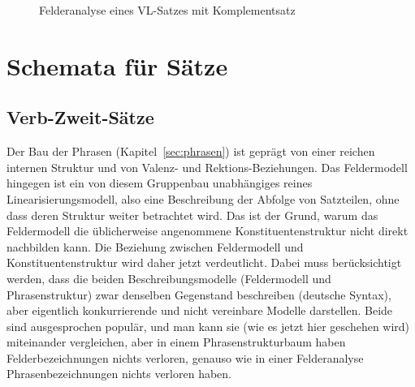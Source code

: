 \begin{figure}
  \centering
  \caption{Felderanalyse eines VL-Satzes mit Komplementsatz}
  \label{fig:syn3334wb2}
\end{figure}

\section{Schemata für Sätze}

\label{sec:satzschemata}
\label{sec:verbzweitsatz}

\subsection{Verb-Zweit-Sätze}

\label{sec:konstituentenstrukturinv2}

Der Bau der Phrasen (Kapitel~\ref{sec:phrasen}) ist geprägt von einer reichen internen Struktur und von Valenz- und Rektions-Beziehungen.
Das Feldermodell hingegen ist ein von diesem Gruppenbau unabhängiges reines Linearisierungsmodell, also eine Beschreibung der Abfolge von Satzteilen, ohne dass deren Struktur weiter betrachtet wird.
Das ist der Grund, warum das Feldermodell die üblicherweise angenommene Konstituentenstruktur nicht direkt nachbilden kann.
Die Beziehung zwischen Feldermodell und Konstituentenstruktur wird daher jetzt verdeutlicht.
Dabei muss berücksichtigt werden, dass die beiden Beschreibungsmodelle (Feldermodell und Phrasenstruktur) zwar denselben Gegenstand beschreiben (deutsche Syntax), aber eigentlich konkurrierende und nicht vereinbare Modelle darstellen.
Beide sind ausgesprochen populär, und man kann sie (wie es jetzt hier geschehen wird) miteinander vergleichen, aber in einem Phrasenstrukturbaum haben Felderbezeichnungen nichts verloren, genauso wie in einer Felderanalyse Phrasenbezeichnungen nichts verloren haben.

